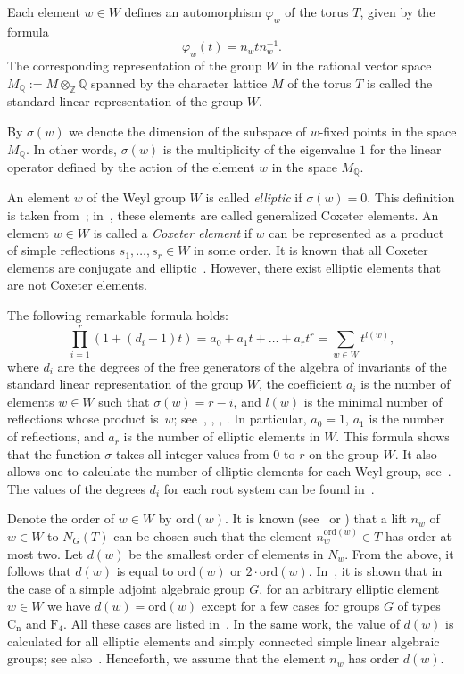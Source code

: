 \documentclass[a4paper,12pt]{amsart}
\theoremstyle{plain}
\theoremstyle{definition}
\newcommand{\ord}{\mathrm{ord}}
\newcommand{\QQ}{\mathbb{Q}}
\newcommand{\ZZ}{\mathbb{Z}}
\begin{document}
Each element $w\in W$ defines an automorphism $\varphi_w$ of the torus $T$, given by the formula
$$
\varphi_w(t)=n_wtn_w^{-1}.
$$
The corresponding representation of the group $W$ in the rational vector space $M_{\QQ} :=M\otimes_{\ZZ}\QQ$ spanned by the character lattice $M$ of the torus $T$ is called the standard linear representation of the group $W$.

By $\sigma(w)$ we denote the dimension of the subspace of $w$-fixed points in the space $M_{\QQ}$. In other words, $\sigma(w)$ is the multiplicity of the eigenvalue $1$ for the linear operator defined by the action of the element $w$ in the space $M_{\QQ}$.

An element $w$ of the Weyl group $W$ is called \emph{elliptic} if $\sigma(w)=0$. This definition is taken from~\cite{Lu}; in~\cite{DW}, these elements are called generalized Coxeter elements. An element $w\in W$ is called a \emph{Coxeter element} if $w$ can be represented as a product of simple reflections $s_1,\ldots,s_r \in W$ in some order. It is known that all Coxeter elements are conjugate and elliptic~\cite[Section~3.16]{Hum}. However, there exist elliptic elements that are not Coxeter elements.

The following remarkable formula holds:
$$
\prod_{i=1}^r (1+(d_i-1)t) = a_0 + a_1t + \ldots + a_rt^r=\sum\limits_{w\in W} t^{l(w)},
$$
where $d_i$ are the degrees of the free generators of the algebra of invariants of the standard linear representation of the group $W$, the coefficient $a_i$ is the number of elements $w\in W$ such that $\sigma(w)=r-i$, and $l(w)$ is the minimal number of reflections whose product is~$w$; see~\cite{ShT}, \cite{So}, \cite[Lemma~2]{CarWeyl}, \cite[Section~3.9]{Hum}. In particular, $a_0=1$, $a_1$ is the number of reflections, and $a_r$ is the number of elliptic elements in $W$. This formula shows that the function $\sigma$ takes all integer values from $0$ to $r$ on the group $W$. It also allows one to calculate the number of elliptic elements for each Weyl group, see~\cite[Section~5]{Fe}. The values of the degrees $d_i$ for each root system can be found in~\cite[Section~3.7]{Hum}.

Denote the order of $w \in W$ by $\ord(w)$. It is known (see~\cite{Ti} or \cite[Lemma~2.1]{AH}) that a lift $n_w$ of $w \in W$ to $N_G(T)$ can be chosen such that the element $n_w^{\ord(w)} \in T$ has order at most two. Let $d(w)$ be the smallest order of elements in $N_w$. From the above, it follows that $d(w)$ is equal to $\ord(w)$ or $2 \cdot \ord(w)$. In~\cite{Za}, it is shown that in the case of a simple adjoint algebraic group $G$, for an arbitrary elliptic element $w \in W$ we have $d(w) = \ord(w)$ except for a few cases for groups $G$ of types $\operatorname{C_n}$ and $\operatorname{F_4}$. All these cases are listed in~\cite[Table~3]{Za}. In the same work, the value of $d(w)$ is calculated for all elliptic elements and simply connected simple linear algebraic groups; see also~\cite[Section~5]{Fe}. Henceforth, we assume that the element $n_w$ has order $d(w)$.
\end{document}
